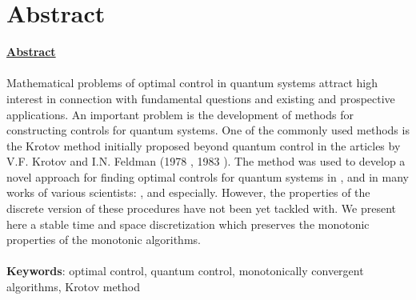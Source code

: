 \chapter*{Abstract}
\Large\textbf{\underline{Abstract}}\\\\\normalsize
Mathematical problems of optimal control in quantum systems attract high interest in connection with fundamental questions and existing and prospective applications. An important problem is the development of methods for constructing controls for quantum systems. One of the commonly used methods is the Krotov method initially proposed beyond quantum control in the articles by V.F. Krotov and I.N. Feldman (1978 \cite{Krotov1}, 1983 \cite{Krotov2}). The method was used to develop a novel approach for finding optimal controls for quantum systems in \cite{Tannor}, and in many works of various scientists: \cite{Zhu}, \cite{Maday} and \cite{Salomon} especially. However, the properties of the discrete version of these procedures have not been yet tackled with.
We present here a stable time and space discretization which preserves the monotonic properties of the monotonic algorithms.\\\\
\textbf{Keywords}: optimal control, quantum control, monotonically convergent algorithms, Krotov method
